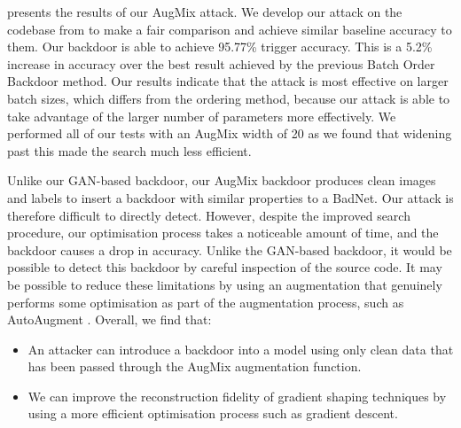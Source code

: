  presents the results of our AugMix attack. We develop our attack on the codebase from \cite{bob} to make a fair comparison and achieve similar baseline accuracy to them. Our backdoor is able to achieve 95.77\% trigger accuracy. This is a 5.2\% increase in accuracy over the best result achieved by the previous Batch Order Backdoor method. Our results indicate that the attack is most effective on larger batch sizes, which differs from the ordering method, because our attack is able to take advantage of the larger number of parameters more effectively. We performed all of our tests with an AugMix width of 20 as we found that widening past this made the search much less efficient.

Unlike our GAN-based backdoor, our AugMix backdoor produces clean images and labels to insert a backdoor with similar properties to a BadNet. 
Our attack is therefore difficult to directly detect. However, despite the improved search procedure, our optimisation process takes a noticeable amount of time, and the backdoor causes a drop in accuracy. Unlike the GAN-based backdoor, it would be possible to detect this backdoor by careful inspection of the source code. It may be possible to reduce these limitations by using an augmentation that genuinely performs some optimisation as part of the augmentation process, such as AutoAugment \citep{autoaug}.
Overall, we find that:

\begin{itemize}
  \item An attacker can introduce a backdoor into a model using only clean data that has been passed through the AugMix augmentation function.
  \item We can improve the reconstruction fidelity of gradient shaping techniques by using a more efficient optimisation process such as gradient descent.
\end{itemize}